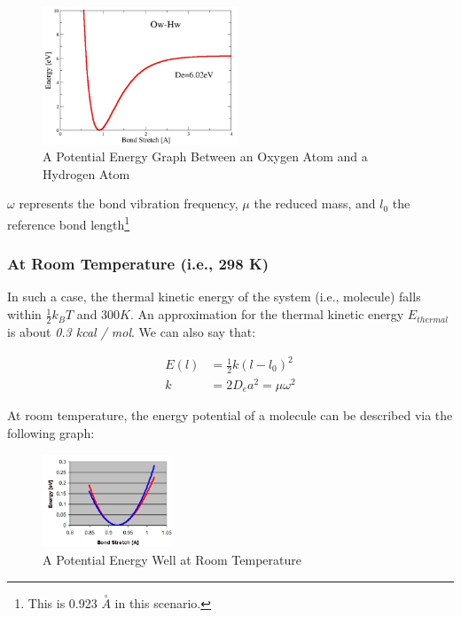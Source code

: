 \documentclass[
  letterpaper,
  DIV=11,
  numbers=noendperiod]{scrreprt}
\begin{document}
\begin{figure}

{\centering \includegraphics[width=2.29in,height=\textheight]{./images/wk2/d3.jpg}

}

\caption{A Potential Energy Graph Between an Oxygen Atom and a Hydrogen
Atom}

\end{figure}

\(\omega\) represents the bond vibration frequency, \(\mu\) the reduced
mass, and \(l_0\) the reference bond length\footnote{This is 0.923
  \(\stackrel{\circ}{A}\) in this scenario.}

\hypertarget{at-room-temperature-i.e.-298-k}{%
\subsubsection{At Room Temperature (i.e., 298
K)}\label{at-room-temperature-i.e.-298-k}}

In such a case, the thermal kinetic energy of the system (i.e.,
molecule) falls within \(\displaystyle \frac{1}{2}k_BT\) and \(300 K\).
An approximation for the thermal kinetic energy \(E_{thermal}\) is about
\emph{0.3 kcal / mol}. We can also say that:

\begin{align}
  E(l) &= \frac{1}{2}k(l - l_0)^2 \\ 
  k &= 2D_ea^2 = \mu\omega^2
\end{align}

At room temperature, the energy potential of a molecule can be described
via the following graph:

\begin{figure}

{\centering \includegraphics[width=1.52in,height=\textheight]{./images/wk2/well.jpg}

}

\caption{A Potential Energy Well at Room Temperature}

\end{figure}
\end{document}
